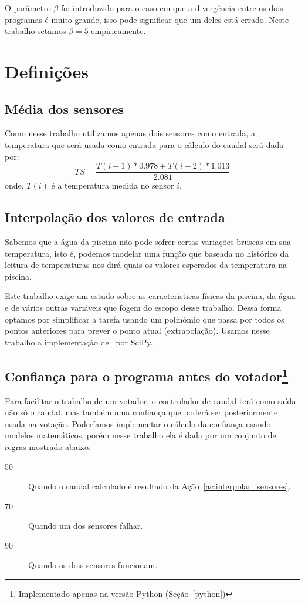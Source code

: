 \documentclass[a4paper,10pt]{article}
\begin{document}
O parâmetro $\beta$ foi introduzido para o caso em que a divergência entre os
dois programas é muito grande, isso pode significar que um deles está errado.
Neste trabalho setamos $\beta=5$ empiricamente.

\section{Definições}

\subsection{Média dos sensores}
Como nesse trabalho utilizamos apenas dois sensores como entrada, a temperatura
que será usada como entrada para o cálculo do caudal será dada por:
\begin{equation}
TS=\frac{T(i-1)*0.978+T(i-2)*1.013}{2.081}
\label{eq:media_temp}
\end{equation}
onde,
$T(i)$ é a temperatura medida no sensor $i$.

\subsection{Interpolação dos valores de entrada}\label{sec:interpolar}
Sabemos que a água da piscina não pode sofrer certas variações
bruscas em sua temperatura, isto é, podemos modelar uma função que baseada no
histórico da leitura de temperaturas nos dirá quais os valores esperados da
temperatura na piscina.

Este trabalho exige um estudo sobre as características físicas da piscina, da
água e de vários outras variáveis que fogem do escopo desse trabalho. Dessa
forma optamos por simplificar a tarefa usando um polinômio que passa por
todos os pontos anteriores para prever o ponto atual (extrapolação). Usamos
nesse trabalho a implementação de~\cite{interpolation} por SciPy.

\subsection{Confiança para o programa antes do votador\footnote{Implementado
	apenas na versão Python (Seção~\ref{python})\label{ft:python}}}
	\label{sec:conf_python}
Para facilitar o trabalho de um votador, o controlador de caudal terá como saída
não só o caudal, mas também uma confiança que poderá ser posteriormente usada na
votação. Poderíamos implementar o cálculo da confiança usando modelos
matemáticos, porém nesse trabalho ela é dada por um conjunto de regras mostrado
abaixo.
\begin{description}%
	\item[50] Quando o caudal calculado é resultado da
		Ação~\ref{ac:interpolar_sensores}.
	\item[70] Quando um dos sensores falhar.
	\item[90] Quando os dois sensores funcionam.
\end{description}
\end{document}
